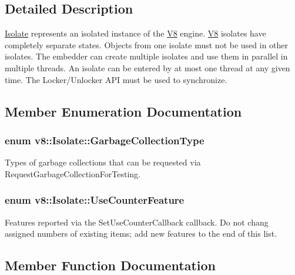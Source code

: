 \subsection{Detailed Description}
\hyperlink{classv8_1_1_isolate}{Isolate} represents an isolated instance of the \hyperlink{classv8_1_1_v8}{V8} engine. \hyperlink{classv8_1_1_v8}{V8} isolates have completely separate states. Objects from one isolate must not be used in other isolates. The embedder can create multiple isolates and use them in parallel in multiple threads. An isolate can be entered by at most one thread at any given time. The Locker/\+Unlocker A\+P\+I must be used to synchronize. 

\subsection{Member Enumeration Documentation}
\hypertarget{classv8_1_1_isolate_a5ae00cc99d8aca148c6f5f9698c432c9}{}
\subsubsection[{Garbage\+Collection\+Type}]{\setlength{\rightskip}{0pt plus 5cm}enum {\bf v8\+::\+Isolate\+::\+Garbage\+Collection\+Type}}\label{classv8_1_1_isolate_a5ae00cc99d8aca148c6f5f9698c432c9}
Types of garbage collections that can be requested via Request\+Garbage\+Collection\+For\+Testing. \hypertarget{classv8_1_1_isolate_aed6909379c3f2820cb3084710b73385d}{}
\subsubsection[{Use\+Counter\+Feature}]{\setlength{\rightskip}{0pt plus 5cm}enum {\bf v8\+::\+Isolate\+::\+Use\+Counter\+Feature}}\label{classv8_1_1_isolate_aed6909379c3f2820cb3084710b73385d}
Features reported via the Set\+Use\+Counter\+Callback callback. Do not chang assigned numbers of existing items; add new features to the end of this list. 

\subsection{Member Function Documentation}
\hypertarget{classv8_1_1_isolate_a89656ac26d523c31fbfdbb12fb32f078}{}

